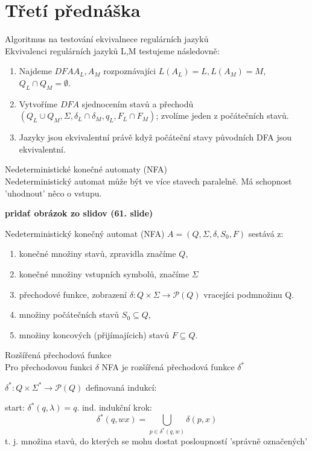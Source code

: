 \documentclass[../main.tex]{subfiles}
\begin{document}
\section{Třetí přednáška}

\begin{definition}
    Algoritmus na testování ekvivalnece regulárních jazyků\\

    Ekvivalenci regulárních jazyků L,M testujeme následovně:
    \begin{enumerate}
        \item Najdeme $DFA A_L, A_M$ rozpoznávajíci $L(A_L) = L, L(A_M) = M$, $Q_L \cap Q_M = \emptyset$.
        \item Vytvoříme $DFA$ sjednocením stavů a přechodů $(Q_L \cup Q_M, \Sigma, \delta_L \cap \delta_M, q_L, F_L \cap F_M)$;
         zvolíme jeden z počátečních stavů.
        \item Jazyky jsou ekvivalentní právě když počáteční stavy původních DFA jsou ekvivalentní. 
    \end{enumerate}
\end{definition}

Nedeterministické konečné automaty (NFA)\\

    Nedeterministický automat může být ve více stavech paralelně. Má schopnost 'uhodnout' něco o vstupu.

    \textbf{ pridať obrázok zo slidov (61. slide)}

\begin{definition}
    Nedeterministický konečný automat (NFA) $A = (Q, \Sigma, \delta, S_0, F)$ sestává z:
    \begin{enumerate}
        \item konečné množiny stavů, zpravidla značíme $Q$,
        \item konečné množiny vstupních symbolů, značíme $\Sigma$
        \item přechodové funkce, zobrazení $\delta : Q \times \Sigma \rightarrow \mathcal{P}(Q)$ vracejíci podmnožinu Q.
        \item množiny počátečních stavů $S_0 \subseteq Q$,
        \item množiny koncových (přijímajícich) stavů $F \subseteq Q$.
    \end{enumerate}
\end{definition}

\begin{definition}
    Rozšířená přechodová funkce\\

    Pro přechodovou funkci $\delta$ NFA je rozšířená přechodová funkce $\delta^*$

    $\delta^* : Q \times \Sigma^* \rightarrow \mathcal{P}(Q)$ definovaná indukcí:

    start: $\delta^*(q,\lambda) = {q}.$
    ind. indukční krok:
    \[\delta^*(q,wx) = \bigcup_{p\in \delta^*(q,w)}\delta(p,x)\]
    t. j. množina stavů, do kterých se mohu dostat posloupností 'správně označených'
\end{definition}
\end{document}
